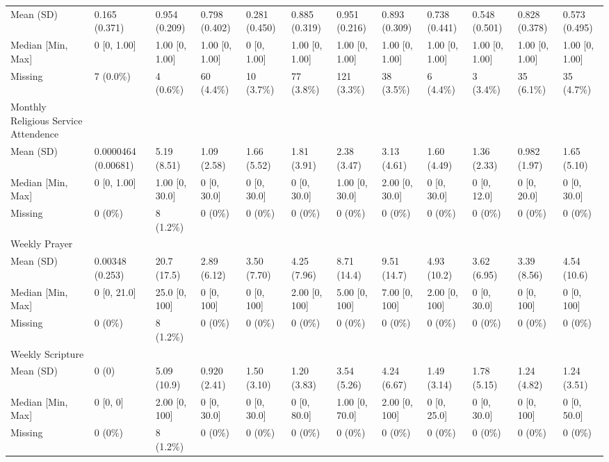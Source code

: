 \documentclass[
  single column]{article}
\begin{document}
\begin{landscape}
\begin{longtable}[t]{llllllllllll}
Mean (SD) & 0.165 (0.371) & 0.954 (0.209) & 0.798 (0.402) & 0.281 (0.450) & 0.885 (0.319) & 0.951 (0.216) & 0.893 (0.309) & 0.738 (0.441) & 0.548 (0.501) & 0.828 (0.378) & 0.573 (0.495)\\
\addlinespace
Median [Min, Max] & 0 [0, 1.00] & 1.00 [0, 1.00] & 1.00 [0, 1.00] & 0 [0, 1.00] & 1.00 [0, 1.00] & 1.00 [0, 1.00] & 1.00 [0, 1.00] & 1.00 [0, 1.00] & 1.00 [0, 1.00] & 1.00 [0, 1.00] & 1.00 [0, 1.00]\\
Missing & 7 (0.0\%) & 4 (0.6\%) & 60 (4.4\%) & 10 (3.7\%) & 77 (3.8\%) & 121 (3.3\%) & 38 (3.5\%) & 6 (4.4\%) & 3 (3.4\%) & 35 (6.1\%) & 35 (4.7\%)\\
Monthly Religious Service Attendence &  &  &  &  &  &  &  &  &  &  & \\
Mean (SD) & 0.0000464 (0.00681) & 5.19 (8.51) & 1.09 (2.58) & 1.66 (5.52) & 1.81 (3.91) & 2.38 (3.47) & 3.13 (4.61) & 1.60 (4.49) & 1.36 (2.33) & 0.982 (1.97) & 1.65 (5.10)\\
Median [Min, Max] & 0 [0, 1.00] & 1.00 [0, 30.0] & 0 [0, 30.0] & 0 [0, 30.0] & 0 [0, 30.0] & 1.00 [0, 30.0] & 2.00 [0, 30.0] & 0 [0, 30.0] & 0 [0, 12.0] & 0 [0, 20.0] & 0 [0, 30.0]\\
\addlinespace
Missing & 0 (0\%) & 8 (1.2\%) & 0 (0\%) & 0 (0\%) & 0 (0\%) & 0 (0\%) & 0 (0\%) & 0 (0\%) & 0 (0\%) & 0 (0\%) & 0 (0\%)\\
Weekly Prayer &  &  &  &  &  &  &  &  &  &  & \\
Mean (SD) & 0.00348 (0.253) & 20.7 (17.5) & 2.89 (6.12) & 3.50 (7.70) & 4.25 (7.96) & 8.71 (14.4) & 9.51 (14.7) & 4.93 (10.2) & 3.62 (6.95) & 3.39 (8.56) & 4.54 (10.6)\\
Median [Min, Max] & 0 [0, 21.0] & 25.0 [0, 100] & 0 [0, 100] & 0 [0, 100] & 2.00 [0, 100] & 5.00 [0, 100] & 7.00 [0, 100] & 2.00 [0, 100] & 0 [0, 30.0] & 0 [0, 100] & 0 [0, 100]\\
Missing & 0 (0\%) & 8 (1.2\%) & 0 (0\%) & 0 (0\%) & 0 (0\%) & 0 (0\%) & 0 (0\%) & 0 (0\%) & 0 (0\%) & 0 (0\%) & 0 (0\%)\\
\addlinespace
Weekly Scripture &  &  &  &  &  &  &  &  &  &  & \\
Mean (SD) & 0 (0) & 5.09 (10.9) & 0.920 (2.41) & 1.50 (3.10) & 1.20 (3.83) & 3.54 (5.26) & 4.24 (6.67) & 1.49 (3.14) & 1.78 (5.15) & 1.24 (4.82) & 1.24 (3.51)\\
Median [Min, Max] & 0 [0, 0] & 2.00 [0, 100] & 0 [0, 30.0] & 0 [0, 30.0] & 0 [0, 80.0] & 1.00 [0, 70.0] & 2.00 [0, 100] & 0 [0, 25.0] & 0 [0, 30.0] & 0 [0, 100] & 0 [0, 50.0]\\
Missing & 0 (0\%) & 8 (1.2\%) & 0 (0\%) & 0 (0\%) & 0 (0\%) & 0 (0\%) & 0 (0\%) & 0 (0\%) & 0 (0\%) & 0 (0\%) & 0 (0\%)\\*

\end{longtable}

\endgroup{}


\end{landscape}
\end{document}
